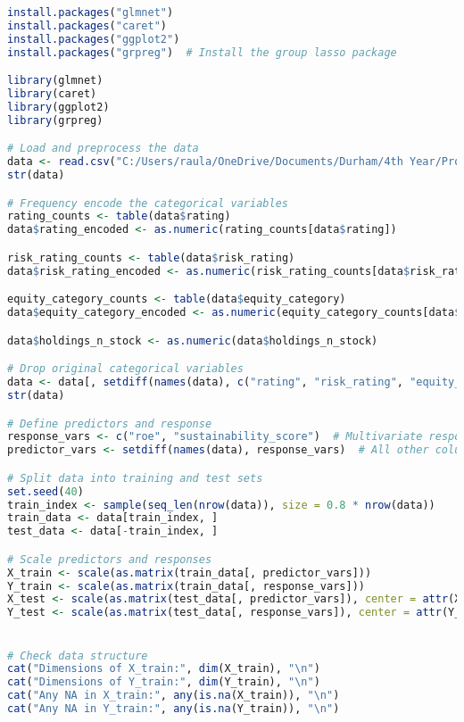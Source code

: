 \begin{lstlisting}[language=R, breaklines=true, basicstyle=\ttfamily\small, columns=fullflexible]
install.packages("glmnet")
install.packages("caret")
install.packages("ggplot2")
install.packages("grpreg")  # Install the group lasso package

library(glmnet)
library(caret)
library(ggplot2)
library(grpreg)

# Load and preprocess the data
data <- read.csv("C:/Users/raula/OneDrive/Documents/Durham/4th Year/Project/Code/Datasets/clean.csv")
str(data)

# Frequency encode the categorical variables
rating_counts <- table(data$rating)
data$rating_encoded <- as.numeric(rating_counts[data$rating])

risk_rating_counts <- table(data$risk_rating)
data$risk_rating_encoded <- as.numeric(risk_rating_counts[data$risk_rating])

equity_category_counts <- table(data$equity_category)
data$equity_category_encoded <- as.numeric(equity_category_counts[data$equity_category])

data$holdings_n_stock <- as.numeric(data$holdings_n_stock)

# Drop original categorical variables
data <- data[, setdiff(names(data), c("rating", "risk_rating", "equity_category"))]
str(data)

# Define predictors and response
response_vars <- c("roe", "sustainability_score")  # Multivariate responses
predictor_vars <- setdiff(names(data), response_vars)  # All other columns are predictors

# Split data into training and test sets
set.seed(40)
train_index <- sample(seq_len(nrow(data)), size = 0.8 * nrow(data))
train_data <- data[train_index, ]
test_data <- data[-train_index, ]

# Scale predictors and responses
X_train <- scale(as.matrix(train_data[, predictor_vars]))
Y_train <- scale(as.matrix(train_data[, response_vars]))
X_test <- scale(as.matrix(test_data[, predictor_vars]), center = attr(X_train, "scaled:center"), scale = attr(X_train, "scaled:scale"))
Y_test <- scale(as.matrix(test_data[, response_vars]), center = attr(Y_train, "scaled:center"), scale = attr(Y_train, "scaled:scale"))


# Check data structure
cat("Dimensions of X_train:", dim(X_train), "\n")
cat("Dimensions of Y_train:", dim(Y_train), "\n")
cat("Any NA in X_train:", any(is.na(X_train)), "\n")
cat("Any NA in Y_train:", any(is.na(Y_train)), "\n")


\end{lstlisting}
